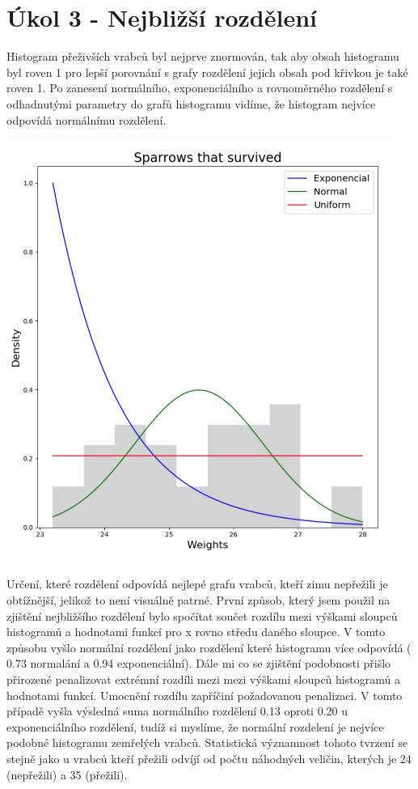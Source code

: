 \documentclass[12pt,a4paper]{article}
\begin{document}
\section{Úkol 3 - Nejbližší rozdělení}
Histogram přeživších vrabců byl nejprve znormován, tak aby obsah histogramu byl roven 1 pro lepší porovnání s grafy rozdělení jejich obsah pod křivkou je také roven 1. Po zanesení normálního, exponenciálního a rovnoměrného rozdělení s odhadnutými parametry do grafů histogramu vidíme, že histogram nejvíce odpovídá normálnímu rozdělení.
\begin{center}
\includegraphics[width=5in]{3_survived}
\end{center}
\pagebreak
Určení, které rozdělení odpovídá nejlepé grafu vrabců, kteří zimu nepřežili je obtížnější, jelikož to není visuálně patrné. První způsob, který jsem použil na zjištění nejbližšího rozdělení bylo spočítat součet rozdílu mezi výškami sloupců histogramů a hodnotami funkcí pro x rovno středu daného sloupce. V tomto způsobu vyšlo normální rozdělení jako rozdělení které histogramu více odpovídá ( 0.73 normalání a 0.94 exponenciální). Dále mi co se zjištění podobnosti přišlo přirozené penalizovat extrémní rozdíli  mezi mezi výškami sloupců histogramů a hodnotami funkcí. Umocnění rozdílu zapříčiní požadovanou penalizaci. V tomto případě vyšla výsledná suma normálního rozdělení 0.13 oproti 0.20 u exponenciálního rozdělení, tudíž si myslíme, že normální rozdelení je nejvíce podobné histogramu zemřelých vrabců. Statistická významnost tohoto tvrzení se stejně jako u vrabců kteří přežili odvíjí od počtu náhodných veličin, kterých je 24 (nepřežili) a 35 (přežili).
\end{document}
